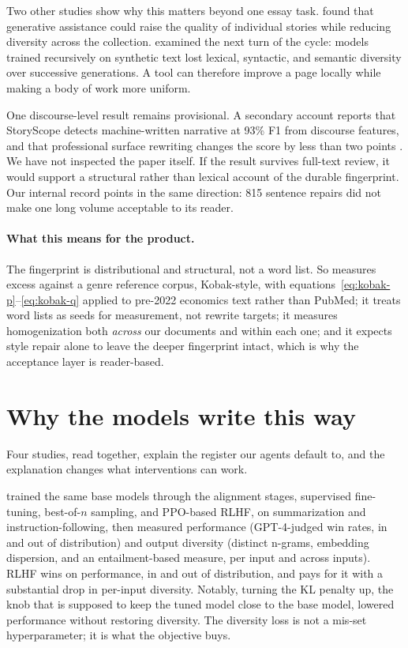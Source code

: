 Two other studies show why this matters beyond one essay task.
\citet{doshi2024generative} found that generative assistance could raise the
quality of individual stories while reducing diversity across the collection.
\citet{guo2023curious} examined the next turn of the cycle: models trained
recursively on synthetic text lost lexical, syntactic, and semantic diversity
over successive generations. A tool can therefore improve a page locally while
making a body of work more uniform.

One discourse-level result remains provisional. A secondary account reports
that StoryScope detects machine-written narrative at 93\% F1 from discourse
features, and that professional surface rewriting changes the score by less
than two points \citep{russell2026storyscope}. We have not inspected the paper
itself. If the result survives full-text review, it would support a structural
rather than lexical account of the durable fingerprint. Our internal record
points in the same direction: 815 sentence repairs did not make one long volume
acceptable to its reader.

\paragraph{What this means for the product.} The fingerprint is distributional
and structural, not a word list. So \hv{} measures excess against a genre
reference corpus, Kobak-style, with
equations~\eqref{eq:kobak-p}--\eqref{eq:kobak-q} applied to pre-2022
economics text rather than PubMed; it treats word lists as seeds for
measurement, not rewrite targets; it measures homogenization both \emph{across}
our documents and within each one; and it expects style repair alone to
leave the deeper fingerprint intact, which is why the acceptance layer is
reader-based.

\section{Why the models write this way}
\label{sec:lit-training}

Four studies, read together, explain the register our agents default to, and
the explanation changes what interventions can work.

\citet{kirk2024understanding} trained the same base models through the
alignment stages, supervised fine-tuning, best-of-$n$ sampling, and
PPO-based RLHF, on summarization and instruction-following, then measured
performance (GPT-4-judged win rates, in and out of distribution) and output
diversity (distinct n-grams, embedding dispersion, and an entailment-based
measure, per input and across inputs). RLHF wins on performance, in and out
of distribution, and pays for it with a substantial drop in per-input
diversity. Notably, turning the KL penalty up, the knob that is supposed to
keep the tuned model close to the base model, lowered performance without
restoring diversity. The diversity loss is not a mis-set hyperparameter; it
is what the objective buys.

